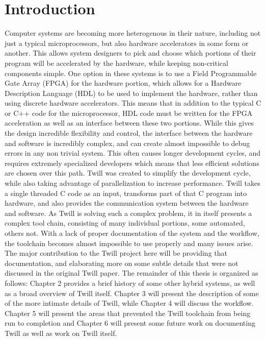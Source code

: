 \chapter{Introduction}
Computer systems are becoming more heterogenous in their nature, including not just a typical microprocessors, but also hardware accelerators in some form or another. This allows system designers to pick and choose which portions of their program will be accelerated by the hardware, while keeping non-critical components simple. 
One option in these systems is to use a Field Programmable Gate Array (FPGA) for the hardware portion, which allows for a Hardware Description Language (HDL) to be used to implement the hardware, rather than using discrete hardware accelerators. This means that in addition to the typical C or C++ code for the microprocessor, HDL code must be written for the FPGA acceleration as well as an interface between these two portions. While this gives the design incredible flexibility and control, the interface between the hardware and software is incredibly complex, and can create almost impossible to debug errors in any non trivial system. This often causes longer development cycles, and requires extremely specialized developers which means that less efficient solutions are chosen over this path.
Twill was created to simplify the development cycle, while also taking advantage of parallelization to increase performance. Twill takes a single threaded C code as an input, transforms part of that C program into hardware, and also provides the communication system between the hardware and software.
As Twill is solving such a complex problem, it in itself presents a complex tool chain, consisting of many individual portions, some automated, others not. With a lack of proper documentation of the system and the workflow, the toolchain becomes almost impossible to use properly and many issues arise.
The major contribution to the Twill project here will be providing that documentation, and elaborating more on some subtle details that were not discussed in the original Twill paper. 
The remainder of this thesis is organized as follows: Chapter 2 provides a brief history of some other hybrid systems, as well as a broad overview of Twill itself. Chapter 3 will present the description of some of the more intimate details of Twill, while Chapter 4 will discuss the workflow. Chapter 5 will present the areas that prevented the Twill toolchain from being run to completion and Chapter 6 will present some future work on documenting Twill as well as work on Twill itself.